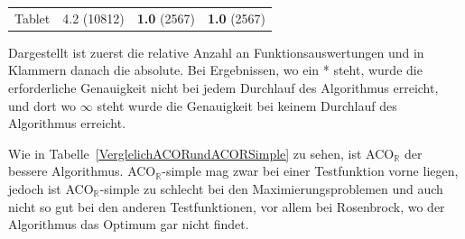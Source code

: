 \documentclass[fontsize=12, a4aper]{scrartcl}
\begin{document}
\begin{table}[H]
\begin{tabularx}{\textwidth}{l|l|l|l}
			Tablet & 4.2 (10812) & \textbf{1.0} (2567) & \textbf{1.0} (2567)
			
		\end{tabularx}
		
		\smallskip
		
		Dargestellt ist zuerst die relative Anzahl an Funktionsauswertungen und in Klammern danach die absolute. Bei Ergebnissen, wo ein * steht, wurde die erforderliche Genauigkeit nicht bei jedem Durchlauf des Algorithmus erreicht, und dort wo \(\infty\) steht wurde die Genauigkeit bei keinem Durchlauf des Algorithmus erreicht.\hfill\newline
		
	\end{table}
	
	Wie in Tabelle~\ref{VerglelichACORundACORSimple} zu sehen, ist ACO\(_{\mathbb{R}}\) der bessere Algorithmus. ACO\(_{\mathbb{R}}\)-simple mag zwar bei einer Testfunktion vorne liegen, jedoch ist ACO\(_{\mathbb{R}}\)-simple zu schlecht bei den Maximierungsproblemen und auch nicht so gut bei den anderen Testfunktionen, vor allem bei \glqq Rosenbrock\grqq, wo der Algorithmus das Optimum gar nicht findet.
	
\end{document}
